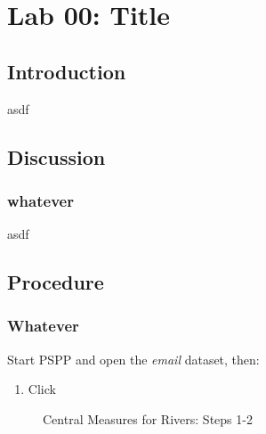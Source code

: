 \chapter{Lab 00: Title}\label{ch:lab00}

\section{Introduction}

asdf 

\section{Discussion}

\subsection{whatever}

asdf


\section{Procedure}

\subsection{Whatever}

Start \acs{PSPP} and open the \textit{email} dataset, then:

\begin{enumerate}
  \item Click \textsc{}
\end{enumerate}

\begin{figure}[H]
  \begin{center}
    \caption{Central Measures for Rivers: Steps 1-2}
    \label{lab02_fig01}    
  \end{center}
\end{figure}

